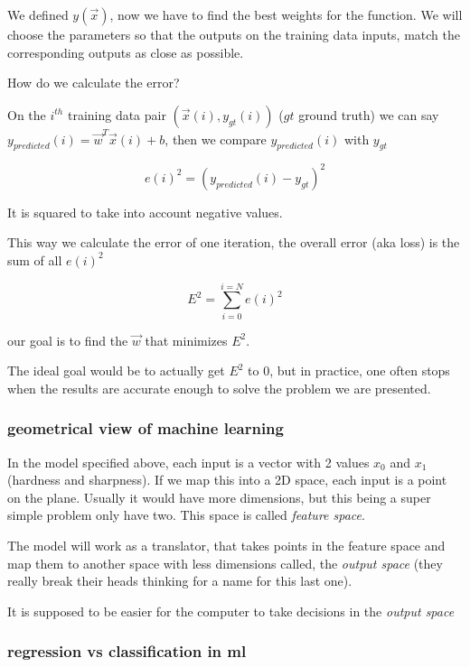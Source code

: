 \documentclass[twocolumn]{article}
\begin{document}
We defined $y(\vec{x})$, now we have to find the best weights for the function.
We will choose the parameters so that the outputs on the training data inputs,
match the corresponding outputs as close as possible.

How do we calculate the error?

On the $i^{th}$ training data pair $(\vec{x}(i), y_{gt}(i))$ ($gt$ ground
truth) we can say $y_{predicted}(i) = \vec{w}^{T}\vec{x}(i) + b$, then we
compare
$y_{predicted}(i)$ with $y_{gt}$

\begin{equation}
    e(i)^2 = (y_{predicted}(i) - y_{gt})^2
\end{equation}

It is squared to take into account negative values.

This way we calculate the error of one iteration, the overall error (aka loss)
is the sum of all $e(i)^2$

\begin{equation}
    E^2 = \sum_{i=0}^{i=N} e(i)^2
\end{equation}

our goal is to find the $\vec{w}$ that minimizes $E^2$.

The ideal goal would be to actually get $E^2$ to 0, but in practice, one often
stops when the results are accurate enough to solve the problem we are
presented.

\subsubsection{geometrical view of machine learning}

In the model specified above, each input is a vector with 2 values $x_0$ and
$x_1$ (hardness and sharpness). If we map this into a 2D space, each input is a
point on the plane. Usually it would have more dimensions, but this being a
super simple problem only have two. This space is called \emph{feature space}.

The model will work as a translator, that takes points in the feature space and
map them to another space with less dimensions called, the \emph{output space}
(they really break their heads thinking for a name for this last one).

It is supposed to be easier for the computer to take decisions in the
\emph{output space}

\subsubsection{regression vs classification in ml}
\end{document}
